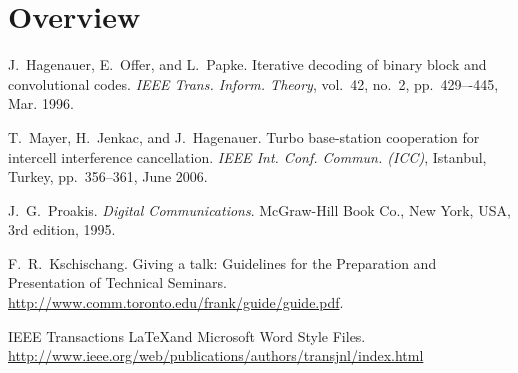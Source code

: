 \documentclass[journal, a4paper]{IEEEtran}
\begin{document}
\section{Overview}



\begin{thebibliography}{5}

	J.~Hagenauer, E.~Offer, and L.~Papke. Iterative decoding of binary block
	and convolutional codes. {\em IEEE Trans. Inform. Theory},
	vol.~42, no.~2, pp.~429–-445, Mar. 1996.

	T.~Mayer, H.~Jenkac, and J.~Hagenauer. Turbo base-station cooperation for intercell interference cancellation. {\em IEEE Int. Conf. Commun. (ICC)}, Istanbul, Turkey, pp.~356--361, June 2006.

	J.~G.~Proakis. {\em Digital Communications}. McGraw-Hill Book Co.,
	New York, USA, 3rd edition, 1995.

	F.~R.~Kschischang. Giving a talk: Guidelines for the Preparation and Presentation of Technical Seminars.
	\url{http://www.comm.toronto.edu/frank/guide/guide.pdf}.

	IEEE Transactions \LaTeX and Microsoft Word Style Files.
	\url{http://www.ieee.org/web/publications/authors/transjnl/index.html}

\end{thebibliography}

\end{document}
